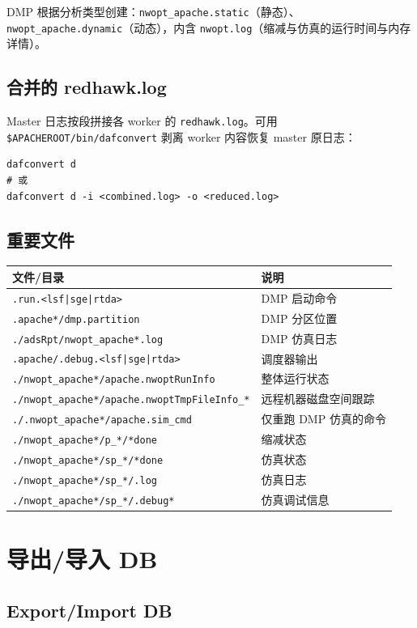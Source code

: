 DMP 根据分析类型创建：\texttt{nwopt\_apache.static}（静态）、\texttt{nwopt\_apache.dynamic}（动态），内含 \texttt{nwopt.log}（缩减与仿真的运行时间与内存详情）。

\subsection{合并的 redhawk.log}
Master 日志按段拼接各 worker 的 \texttt{redhawk.log}。可用 \texttt{\$APACHEROOT/bin/dafconvert} 剥离 worker 内容恢复 master 原日志：
\begin{lstlisting}
dafconvert d
# 或
dafconvert d -i <combined.log> -o <reduced.log>
\end{lstlisting}

\subsection{重要文件}
\begin{table}[htbp]
\centering
\small
\begin{tabular}{ll}
\toprule
\textbf{文件/目录} & \textbf{说明} \\
\midrule
\texttt{.run.<lsf|sge|rtda>} & DMP 启动命令 \\
\texttt{.apache*/dmp.partition} & DMP 分区位置 \\
\texttt{./adsRpt/nwopt\_apache*.log} & DMP 仿真日志 \\
\texttt{.apache/.debug.<lsf|sge|rtda>} & 调度器输出 \\
\texttt{./nwopt\_apache*/apache.nwoptRunInfo} & 整体运行状态 \\
\texttt{./nwopt\_apache*/apache.nwoptTmpFileInfo\_*} & 远程机器磁盘空间跟踪 \\
\texttt{./.nwopt\_apache*/apache.sim\_cmd} & 仅重跑 DMP 仿真的命令 \\
\texttt{./nwopt\_apache*/p\_*/*done} & 缩减状态 \\
\texttt{./nwopt\_apache*/sp\_*/*done} & 仿真状态 \\
\texttt{./nwopt\_apache*/sp\_*/.log} & 仿真日志 \\
\texttt{./nwopt\_apache*/sp\_*/.debug*} & 仿真调试信息 \\
\bottomrule
\end{tabular}
\end{table}

\section{导出/导入 DB}
\subsection*{Export/Import DB}

